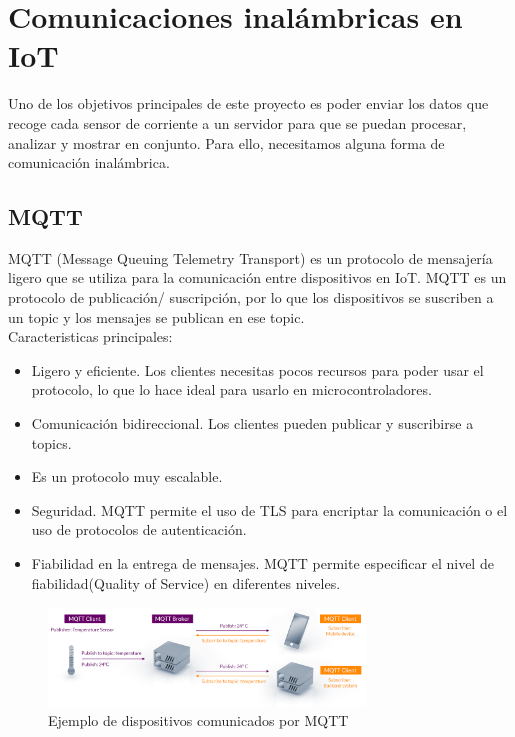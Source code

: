 \begin{titlepage}
\begin{lstlisting}[language=Python]
\end{lstlisting}
\section{Comunicaciones inalámbricas en IoT}
Uno de los objetivos principales de este proyecto es poder enviar los datos que recoge cada sensor de corriente a un servidor para que se puedan procesar, analizar y mostrar en conjunto. Para ello, necesitamos alguna forma de comunicación inalámbrica. \\
\subsection{MQTT}
MQTT (Message Queuing Telemetry Transport) \cite{ref14} es un protocolo de mensajería ligero que se utiliza para la comunicación entre dispositivos en IoT. MQTT es un protocolo de publicación/ suscripción, por lo que los dispositivos se suscriben a un topic y los mensajes se publican en ese topic. \\

Caracteristicas principales:
\begin{itemize}
	\item Ligero y eficiente. Los clientes necesitas pocos recursos para poder usar el protocolo, lo que lo hace ideal para usarlo en microcontroladores.
	\item Comunicación bidireccional. Los clientes pueden publicar y suscribirse a topics.
	\item Es un protocolo muy escalable.
	\item Seguridad. MQTT permite el uso de TLS para encriptar la comunicación o el uso de protocolos de autenticación.
	\item Fiabilidad en la entrega de mensajes. MQTT permite especificar el nivel de fiabilidad(Quality of Service) en diferentes niveles. 
\end{itemize}
\begin{figure}[h!]
	\centering
	\includegraphics[width=0.75\textwidth]{imagenes/mqtt.png}
	\caption{Ejemplo de dispositivos comunicados por MQTT\cite{mqtt_img}}
\end{figure}


\end{titlepage}
